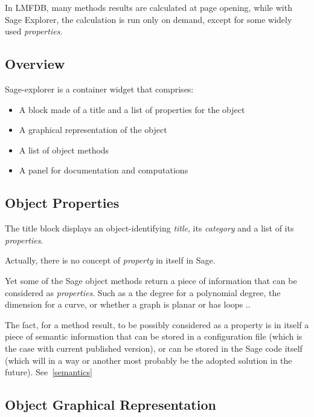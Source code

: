 \documentclass{deliverablereport}
\begin{document}

In LMFDB, many methods results are calculated at page opening, while
with Sage Explorer, the calculation is run only on demand, except for
some widely used \emph{properties}.


\subsection{Overview}

Sage-explorer is a container widget that comprises:

\begin{itemize}
  \item A block made of a title and a list of properties for the object
  \item A graphical representation of the object
  \item A list of object methods
  \item A panel for documentation and computations
\end{itemize}


\subsection{Object Properties}

The title block displays an object-identifying \emph{title}, its
\emph{category} and a list of its \emph{properties}.

Actually, there is no concept of \emph{property} in itself in Sage.

Yet some of the Sage object methods return a piece of information that
can be considered as \emph{properties}. Such as a the degree for a
polynomial degree, the dimension for a curve, or whether a graph is
planar or has loops ..

The fact, for a method result, to be possibly considered as a property
is in itself a piece of semantic information that can be stored in a
configuration file (which is the case with current published version),
or can be stored in the Sage code itself (which will in a way or
another most probably be the adopted solution in the future). See~\ref{semantics}

\subsection{Object Graphical Representation}
\label{representation}
\end{document}
